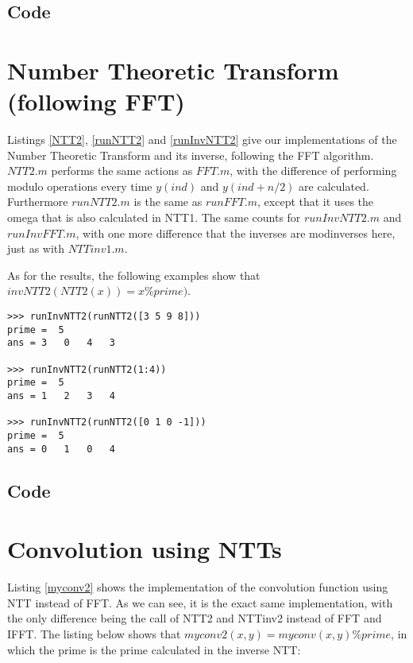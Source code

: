\documentclass{article}
\begin{document}
\subsection{Code}
 
 
 

\section{Number Theoretic Transform (following FFT)}
Listings \ref{NTT2}, \ref{runNTT2} and \ref{runInvNTT2} give our implementations of the Number Theoretic Transform and its inverse, following the FFT algorithm. $NTT2.m$ performs the same actions as $FFT.m$, with the difference of performing modulo operations every time $y(ind)$ and $y(ind + n/2)$ are calculated. Furthermore $runNTT2.m$ is the same as $runFFT.m$, except that it uses the omega that is also calculated in NTT1. The same counts for $runInvNTT2.m$ and $runInvFFT.m$, with one more difference that the inverses are modinverses here, just as with $NTTinv1.m$. 

As for the results, the following examples show that $invNTT2(NTT2(x)) = x \% prime)$.

\begin{lstlisting}
>>> runInvNTT2(runNTT2([3 5 9 8]))
prime =  5
ans = 3   0   4   3

>>> runInvNTT2(runNTT2(1:4))
prime =  5
ans = 1   2   3   4

>>> runInvNTT2(runNTT2([0 1 0 -1]))
prime =  5
ans = 0   1   0   4
\end{lstlisting}

\subsection{Code}




\section{Convolution using NTTs}
Listing \ref{myconv2} shows the implementation of the convolution function using NTT instead of FFT. As we can see, it is the exact same implementation, with the only difference being the call of NTT2 and NTTinv2 instead of FFT and IFFT. The listing below shows that $myconv2(x, y) = myconv(x,y) \% prime$, in which the prime is the prime calculated in the inverse NTT:
\end{document}
